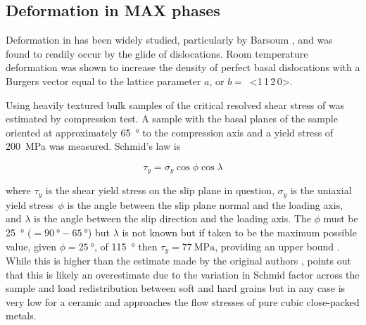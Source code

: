 \subsection{Deformation in MAX phases}

Deformation in  has been widely studied, particularly by Barsoum \cite{Farber1998,Barsoum1999,Farber1999,Barsoum1999dislocs_kinkbands,Barsoum2001}, and was found to readily occur by the glide of dislocations. Room temperature deformation was shown to increase the density of perfect basal dislocations with a Burgers vector equal to the lattice parameter $a$, or $b =$~<1\,1\,\={2}\,0>. 

Using heavily textured bulk samples of  the critical resolved shear stress of  was estimated by compression test. A sample with the basal planes of the sample oriented at approximately \SI{65}{\degree} to the compression axis and a yield stress of \SI{200}{\mega\pascal} was measured. Schmid's law is 

\begin{equation}
\tau_y = \sigma_y \cos{\phi} \cos{\lambda}
\end{equation}

where $\tau_y$ is the shear yield stress on the slip plane in question, $\sigma_y$ is the uniaxial yield stress\ $\phi$ is the angle between the slip plane normal and the loading axis, and $\lambda$ is the angle between the slip direction and the loading axis. The $\phi$ must be \SI{25}{\degree} ($=\SI{90}{\degree} - \SI{65}{\degree}$) but $\lambda$ is not known but if taken to be the maximum possible value, given $\phi=\SI{25}{\degree}$, of \SI{115}{\degree} then $\tau_y = \SI{77}{\mega\pascal}$, providing an upper bound \cite{Humphrey2012}. While this is higher than the estimate made by the original authors \cite{Barsoum1999}, \citet{Humphrey2012} points out that this is likely an overestimate due to the variation in Schmid factor across the sample and load redistribution between soft and hard grains but in any case is very low for a ceramic and approaches the flow stresses of pure cubic close-packed metals.


%
%
%
%
%
%
%
%
%
%
%
%


